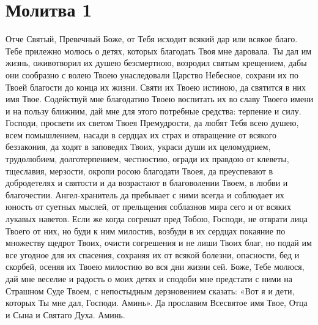 \section{Молитва 1}\begin{mymulticols}



Отче Святый, Превечный Боже, от Тебя исходит всякий дар или всякое благо. Тебе прилежно молюсь о детях, которых благодать Твоя мне даровала. Ты дал им жизнь, оживотворил их душею безсмертною, возродил святым крещением, дабы они сообразно с волею Твоею унаследовали Царство Небесное, сохрани их по Твоей благости до конца их жизни. Святи их Твоею истиною, да святится в них имя Твое. Содействуй мне благодатию Твоею воспитать их во славу Твоего имени и на пользу ближним, дай мне для этого потребные средства: терпение и силу. Господи, просвети их светом Твоея Премудрости, да любят Тебя всею душею, всем помышлением, насади в сердцах их страх и отвращение от всякого беззакония, да ходят в заповедях Твоих, украси души их целомудрием, трудолюбием, долготерпением, честностию, огради их правдою от клеветы, тщеславия, мерзости, окропи росою благодати Твоея, да преуспевают в добродетелях и святости и да возрастают в благоволении Твоем, в любви и благочестии. Ангел-хранитель да пребывает с ними всегда и соблюдает их юность от суетных мыслей, от прельщения соблазнов мира сего и от всяких лукавых наветов. Если же когда согрешат пред Тобою, Господи, не отврати лица Твоего от них, но буди к ним милостив, возбуди в их сердцах покаяние по множеству щедрот Твоих, очисти согрешения и не лиши Твоих благ, но подай им все угодное для их спасения, сохраняя их от всякой болезни, опасности, бед и скорбей, осеняя их Твоею милостию во вся дни жизни сей. Боже, Тебе молюся, дай мне веселие и радость о моих детях и сподоби мне предстати с ними на Страшном Суде Твоем, с непостыдным дерзновением сказать: «Вот я и дети, которых Ты мне дал, Господи. Аминь». Да прославим Всесвятое имя Твое, Отца и Сына и Святаго Духа. Аминь.


\end{mymulticols}

